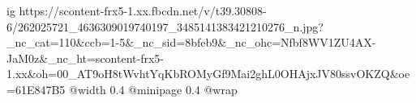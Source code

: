  
 
 
 
 

\ifcmt
  ig https://scontent-frx5-1.xx.fbcdn.net/v/t39.30808-6/262025721_4636309019740197_3485141383421210276_n.jpg?_nc_cat=110&ccb=1-5&_nc_sid=8bfeb9&_nc_ohc=Nfbf8WV1ZU4AX-JaM0z&_nc_ht=scontent-frx5-1.xx&oh=00_AT9oH8tWvhtYqKbROMyGf9Mai2ghL0OHAjxJV80ssvOKZQ&oe=61E847B5
  @width 0.4
  @minipage 0.4
  @wrap \parpic[r]
\fi
